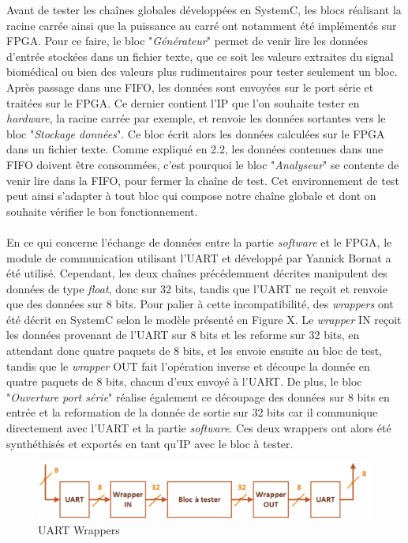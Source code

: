 \documentclass[a4paper,12pt]{article}
\begin{document}
	Avant de tester les chaînes globales développées en SystemC, les blocs réalisant la racine carrée ainsi que la puissance au carré ont notamment été implémentés sur FPGA. Pour ce faire, le bloc "\textit{Générateur}" permet de venir lire les données d'entrée stockées dans un fichier texte, que ce soit les valeurs extraites du signal biomédical ou bien des valeurs plus rudimentaires pour tester seulement un bloc. Après passage dans une FIFO, les données sont envoyées sur le port série et traitées sur le FPGA. Ce dernier contient l'IP que l'on souhaite tester en \textit{hardware}, la racine carrée par exemple, et renvoie les données sortantes vers le bloc "\textit{Stockage données}". Ce bloc écrit alors les données calculées sur le FPGA dans un fichier texte. Comme expliqué en 2.2, les données contenues dans une FIFO doivent être consommées, c'est pourquoi le bloc "\textit{Analyseur}" se contente de venir lire dans la FIFO, pour fermer la chaîne de test. Cet environnement de test peut ainsi s'adapter à tout bloc qui compose notre chaîne globale et dont on souhaite vérifier le bon fonctionnement. \\ \\
	\indent En ce qui concerne l'échange de données entre la partie \textit{software} et le FPGA, le module de communication utilisant l'UART et développé par Yannick Bornat a été utilisé. Cependant, les deux chaînes précédemment décrites manipulent des données de type \textit{float}, donc sur 32 bits, tandis que l'UART ne reçoit et renvoie que des données sur 8 bits. Pour palier à cette incompatibilité, des \textit{wrappers} ont été décrit en SystemC selon le modèle présenté en Figure X. Le \textit{wrapper} IN reçoit les données provenant de l'UART sur 8 bits et les reforme sur 32 bits, en attendant donc quatre paquets de 8 bits, et les envoie ensuite au bloc de test, tandis que le \textit{wrapper} OUT fait l'opération inverse et découpe la donnée en quatre paquets de 8 bits, chacun d'eux envoyé à l'UART. De plus, le bloc "\textit{Ouverture port série}" réalise également ce découpage des données sur 8 bits en entrée et la reformation de la donnée de sortie sur 32 bits car il communique directement avec l'UART et la partie \textit{software}. Ces deux wrappers ont alors été synthéthisés et exportés en tant qu'IP avec le bloc à tester.  
	\begin{figure}[H]
		\centering
		\includegraphics[width=\textwidth]{Dessin7.png}
		\caption{UART Wrappers}
	\end{figure}   
\end{document}

